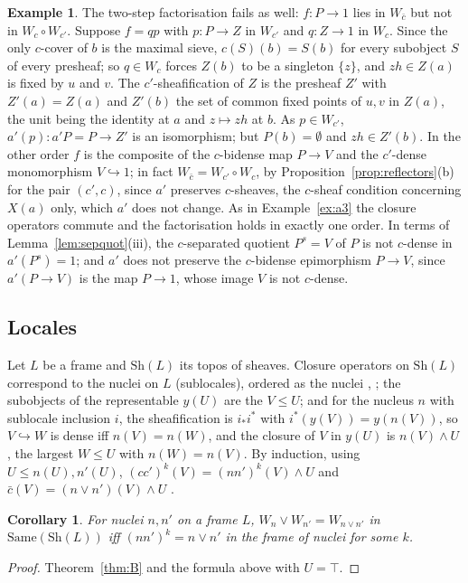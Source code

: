 \documentclass[11pt]{amsart}
\newtheorem{cor}[thm]{Corollary}
\theoremstyle{definition}
\newtheorem{ex}[thm]{Example}
\newcommand{\Same}{\mathrm{Same}}
\newcommand{\Sh}{\mathrm{Sh}}
\begin{document}
\begin{ex}
The two-step factorisation fails as well: $f\colon P\to1$ lies in
$W_{\bar c}$ but not in $W_c\circ W_{c'}$. Suppose $f=qp$ with $p\colon
P\to Z$ in $W_{c'}$ and $q\colon Z\to1$ in $W_c$. Since the only
$c$-cover of $b$ is the maximal sieve, $c(S)(b)=S(b)$ for every subobject
$S$ of every presheaf; so $q\in W_c$ forces $Z(b)$ to be a singleton
$\{z\}$, and $zh\in Z(a)$ is fixed by $u$ and $v$. The $c'$-sheafification
of $Z$ is the presheaf $Z'$ with $Z'(a)=Z(a)$ and $Z'(b)$ the set of
common fixed points of $u,v$ in $Z(a)$, the unit being the identity at $a$
and $z\mapsto zh$ at $b$. As $p\in W_{c'}$, $a'(p)\colon a'P=P\to Z'$ is
an isomorphism; but $P(b)=\emptyset$ and $zh\in Z'(b)$. In the other order
$f$ is the composite of the $c$-bidense map $P\to V$ and the $c'$-dense
monomorphism $V\hookrightarrow1$; in fact $W_{\bar c}=W_{c'}\circ W_c$, by
Proposition~\ref{prop:reflectors}(b) for the pair $(c',c)$, since $a'$
preserves $c$-sheaves, the $c$-sheaf condition concerning $X(a)$ only,
which $a'$ does not change. As in Example~\ref{ex:a3} the closure
operators commute and the factorisation holds in exactly one order. In
terms of Lemma~\ref{lem:sepquot}(iii), the $c$-separated quotient $P^s=V$
of $P$ is not $c$-dense in $a'(P^s)=1$; and $a'$ does not preserve the
$c$-bidense epimorphism $P\to V$, since $a'(P\to V)$ is the map $P\to1$,
whose image $V$ is not $c$-dense.
\end{ex}

\subsection{Locales}\label{sub:locale}
Let $L$ be a frame and $\Sh(L)$ its topos of sheaves. Closure operators on
$\Sh(L)$ correspond to the nuclei on $L$ (sublocales), ordered as the
nuclei \cite[II.2]{StoneSpaces}, \cite[A4.5]{Elephant}; the subobjects of
the representable $y(U)$ are the $V\le U$; and for the nucleus $n$ with
sublocale inclusion $i$, the sheafification is $i_*i^*$ with $i^*(y(V))=
y(n(V))$, so $V\hookrightarrow W$ is dense iff $n(V)=n(W)$, and the closure of
$V$ in $y(U)$ is $n(V)\wedge U$, the largest $W\le U$ with $n(W)=n(V)$. By
induction, using $U\le n(U),n'(U)$, $(cc')^k(V)=(nn')^k(V)\wedge U$ and
$\bar c(V)=(n\vee n')(V)\wedge U$ \cite[Lemma~7.1]{Stabjoin}.

\begin{cor}\label{cor:localic}
For nuclei $n,n'$ on a frame $L$, $W_n\vee W_{n'}=W_{n\vee n'}$ in
$\Same(\Sh(L))$ iff $(nn')^k=n\vee n'$ in the frame of nuclei for some $k$.
\end{cor}
\begin{proof}
Theorem~\ref{thm:B} and the formula above with $U=\top$.
\end{proof}
\end{document}

